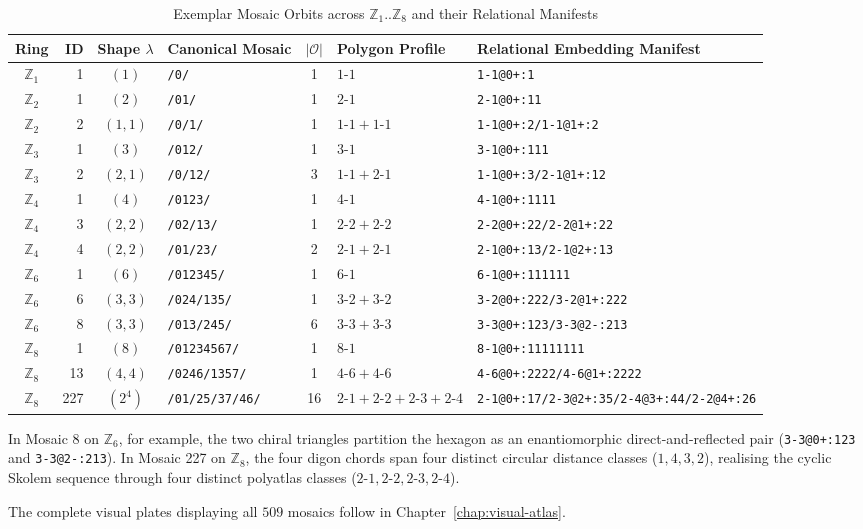 \begin{table}[htbp]
\centering
\footnotesize
\setlength{\tabcolsep}{2.8pt}
\caption{\label{tab:sample-manifests}Exemplar Mosaic Orbits across $\mathbb{Z}_1..\mathbb{Z}_8$ and their Relational Manifests}
\begin{tabular}{c r c l c l l}
\toprule
Ring & ID & Shape $\lambda$ & Canonical Mosaic & $|\mathcal{O}|$ & Polygon Profile & Relational Embedding Manifest \\
\midrule
$\mathbb{Z}_1$ & 1 & $(1)$ & \texttt{/0/} & 1 & $1\text{-}1$ & \texttt{1-1@0+:1} \\
$\mathbb{Z}_2$ & 1 & $(2)$ & \texttt{/01/} & 1 & $2\text{-}1$ & \texttt{2-1@0+:11} \\
$\mathbb{Z}_2$ & 2 & $(1,1)$ & \texttt{/0/1/} & 1 & $1\text{-}1 + 1\text{-}1$ & \texttt{1-1@0+:2/1-1@1+:2} \\
$\mathbb{Z}_3$ & 1 & $(3)$ & \texttt{/012/} & 1 & $3\text{-}1$ & \texttt{3-1@0+:111} \\
$\mathbb{Z}_3$ & 2 & $(2,1)$ & \texttt{/0/12/} & 3 & $1\text{-}1 + 2\text{-}1$ & \texttt{1-1@0+:3/2-1@1+:12} \\
$\mathbb{Z}_4$ & 1 & $(4)$ & \texttt{/0123/} & 1 & $4\text{-}1$ & \texttt{4-1@0+:1111} \\
$\mathbb{Z}_4$ & 3 & $(2,2)$ & \texttt{/02/13/} & 1 & $2\text{-}2 + 2\text{-}2$ & \texttt{2-2@0+:22/2-2@1+:22} \\
$\mathbb{Z}_4$ & 4 & $(2,2)$ & \texttt{/01/23/} & 2 & $2\text{-}1 + 2\text{-}1$ & \texttt{2-1@0+:13/2-1@2+:13} \\
$\mathbb{Z}_6$ & 1 & $(6)$ & \texttt{/012345/} & 1 & $6\text{-}1$ & \texttt{6-1@0+:111111} \\
$\mathbb{Z}_6$ & 6 & $(3,3)$ & \texttt{/024/135/} & 1 & $3\text{-}2 + 3\text{-}2$ & \texttt{3-2@0+:222/3-2@1+:222} \\
$\mathbb{Z}_6$ & 8 & $(3,3)$ & \texttt{/013/245/} & 6 & $3\text{-}3 + 3\text{-}3$ & \texttt{3-3@0+:123/3-3@2-:213} \\
$\mathbb{Z}_8$ & 1 & $(8)$ & \texttt{/01234567/} & 1 & $8\text{-}1$ & \texttt{8-1@0+:11111111} \\
$\mathbb{Z}_8$ & 13 & $(4,4)$ & \texttt{/0246/1357/} & 1 & $4\text{-}6 + 4\text{-}6$ & \texttt{4-6@0+:2222/4-6@1+:2222} \\
$\mathbb{Z}_8$ & 227 & $(2^4)$ & \texttt{/01/25/37/46/} & 16 & $2\text{-}1{+}2\text{-}2{+}2\text{-}3{+}2\text{-}4$ & \texttt{2-1@0+:17/2-3@2+:35/2-4@3+:44/2-2@4+:26} \\
\bottomrule
\end{tabular}
\end{table}

In Mosaic 8 on $\mathbb{Z}_6$, for example, the two chiral triangles partition the hexagon as an enantiomorphic direct-and-reflected pair (\texttt{3-3@0+:123} and \texttt{3-3@2-:213}). In Mosaic 227 on $\mathbb{Z}_8$, the four digon chords span four distinct circular distance classes ($1, 4, 3, 2$), realising the cyclic Skolem sequence through four distinct polyatlas classes ($2\text{-}1, 2\text{-}2, 2\text{-}3, 2\text{-}4$).

The complete visual plates displaying all $509$ mosaics follow in Chapter~\ref{chap:visual-atlas}.
